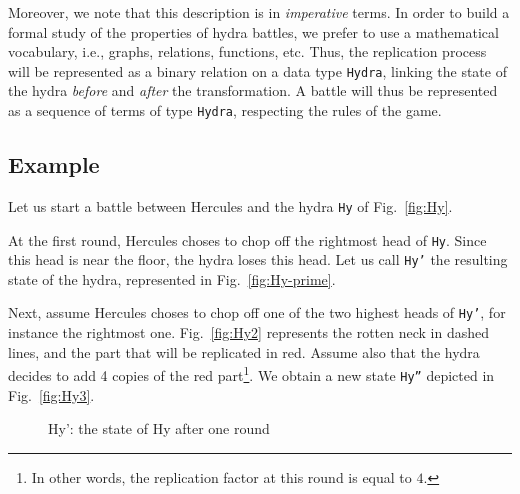 Moreover, we note that this description is in \emph{imperative} terms. In order to build a formal  study of the properties of hydra battles, we prefer to use a mathematical vocabulary, i.e., graphs, relations, functions, etc.
Thus, the replication process will be represented as a binary relation on a data type \texttt{Hydra},
linking the state of the hydra \emph{before} and \emph{after} the transformation.
A battle will thus be represented as a sequence of terms of type \texttt{Hydra}, respecting the rules of the game.





\subsection{Example}
Let us start a battle between Hercules and the hydra \texttt{Hy} of Fig.~\ref{fig:Hy}.

At the first round, Hercules choses to chop off the rightmost head of \texttt{Hy}.
Since this head is near the floor, the hydra loses this head. Let us call 
 \texttt{Hy'} the resulting state of the hydra, represented in Fig.~\vref{fig:Hy-prime}.

Next, assume Hercules choses to chop off one of the two highest heads of \texttt{Hy'}, for instance the rightmost one. Fig.~\vref{fig:Hy2} represents the rotten neck in dashed lines, and the part that will be replicated in red. Assume also that the hydra decides to add 4 copies of the red part\footnote{In other words, the replication factor at this round is equal to $4$.}. We obtain a new state \texttt{Hy''} depicted in Fig.~\ref{fig:Hy3}.



\begin{figure}[h]
\centering
{}

\caption{Hy': the state  of Hy after one round \label{fig:Hy-prime}}
\end{figure}


